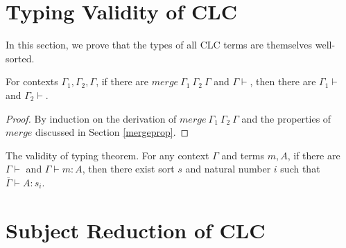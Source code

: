 \documentclass[sigplan,screen,review,anonymous]{acmart}
\newcommand{\mrg}[3]{merge\ {#1}\ {#2}\ {#3}}
\begin{document}
\section{Typing Validity of CLC}

In this section, we prove that the types of all CLC terms are themselves well-sorted.

\begin{lemma}\label{mergecontextokinv}
  For contexts $\Gamma_1, \Gamma_2, \Gamma$, if there are $\mrg{\Gamma_1}{\Gamma_2}{\Gamma}$ and $\Gamma \vdash$, then there are $\Gamma_1 \vdash$ and $\Gamma_2 \vdash$.
\end{lemma}
\begin{proof}
  By induction on the derivation of $\mrg{\Gamma_1}{\Gamma_2}{\Gamma}$ and the properties of $merge$ discussed in Section \ref{mergeprop}.
\end{proof}

\begin{theorem}\label{valid}
  The validity of typing theorem. For any context $\Gamma$ and terms $m, A$, if there are $\Gamma \vdash$ and $\Gamma \vdash m : A$, then there exist sort $s$ and natural number $i$ such that $\overline{\Gamma} \vdash A : s_i$.
\end{theorem}

\section{Subject Reduction of CLC}
\end{document}
